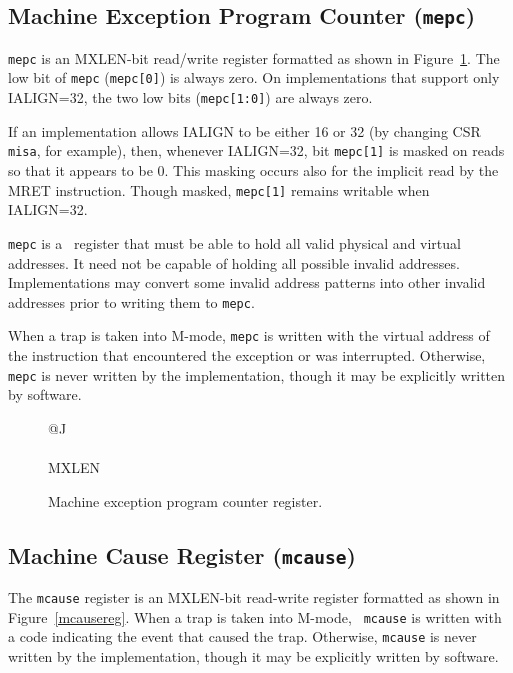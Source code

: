 \subsection{Machine Exception Program Counter ({\tt mepc})}

{\tt mepc} is an MXLEN-bit read/write register formatted as shown in
Figure~\ref{mepcreg}.  The low bit of {\tt mepc} ({\tt mepc[0]}) is
always zero.  On implementations that support only IALIGN=32, the two low bits
({\tt mepc[1:0]}) are always zero.

If an implementation allows IALIGN to be either 16 or 32 (by
changing CSR {\tt misa}, for example), then, whenever IALIGN=32, bit
{\tt mepc[1]} is masked on reads so that it appears to be 0.  This
masking occurs also for the implicit read by the MRET instruction.
Though masked, {\tt mepc[1]} remains writable when IALIGN=32.

{\tt mepc} is a \warl\ register that must be able to hold all valid physical
and virtual addresses.  It need not be capable of holding all possible invalid
addresses.  Implementations may convert some invalid address patterns into
other invalid addresses prior to writing them to {\tt mepc}.

When a trap is taken into M-mode, {\tt mepc} is written with the virtual
address of the instruction that encountered the exception or was interrupted.
Otherwise, {\tt mepc} is never written by the implementation, though it may be
explicitly written by software.

\begin{figure}[h!]
{\footnotesize
\begin{center}
\begin{tabular}{@{}J}
 \\
\hline
{} \\
\hline
MXLEN \\
\end{tabular}
\end{center}
}
\vspace{-0.1in}
\caption{Machine exception program counter register.}
\label{mepcreg}
\end{figure}

\subsection{Machine Cause Register ({\tt mcause})}

The {\tt mcause} register is an MXLEN-bit read-write register formatted as
shown in Figure~\ref{mcausereg}.  When a trap is taken into M-mode, {\tt
mcause} is written with a code indicating the event that caused the trap.
Otherwise, {\tt mcause} is never written by the implementation, though it may be
explicitly written by software.

